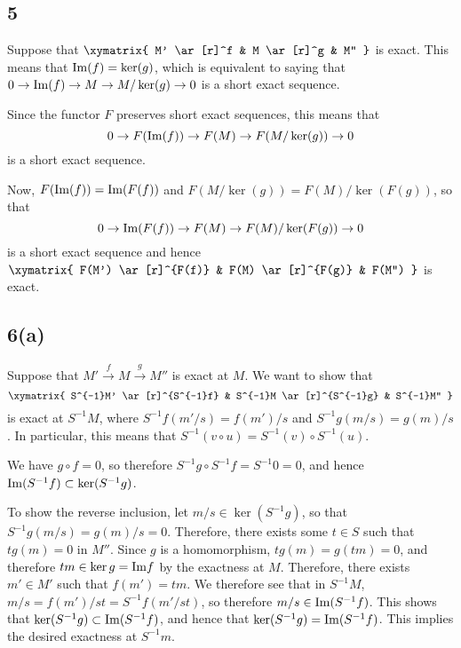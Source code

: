 \documentclass[12pt, reqno]{amsart}
\begin{document}




\newpage

\subsection*{5}

Suppose that 
$ 
\xymatrix{
M' \ar[r]^f & M \ar[r]^g & M'' 
}
$
is exact. This means that $\mathrm{Im}(f) = \ker(g)$, which 
is equivalent to saying that 
$0 \to \mathrm{Im}(f) \to M \to M/\ker(g) \to 0$
is a short exact sequence.

Since the functor $F$ preserves short exact sequences, this means that
$$0 \to F(\mathrm{Im}(f)) \to F(M) \to F(M / \ker(g)) \to 0$$ is a short exact sequence.

Now, $F(\mathrm{Im}(f)) = \mathrm{Im}(F(f))$ and $F ( M / \ker(g)) = F(M) / \ker(F(g))$, so that
$$0 \to \mathrm{Im}(F(f)) \to F(M) \to F(M) / \ker(F(g)) \to 0$$ is a short exact
sequence and hence 
$
\xymatrix{
F(M') \ar[r]^{F(f)} & F(M) \ar[r]^{F(g)} & F(M'') 
}
$
is exact.



\subsection*{6(a)}

Suppose that $M' \xrightarrow f M \xrightarrow g  M''$ is exact at $M$.
We want to show that 
\[ 
\xymatrix{
S^{-1}M' \ar[r]^{S^{-1}f} & S^{-1}M \ar[r]^{S^{-1}g} & S^{-1}M'' 
}
\] 
is exact at $S^{-1}M$, where
$S^{-1}f(m'/s) = f(m')/s$ and $S^{-1}g(m/s) = g(m)/s$. In particular, this
means that $S^{-1} (v \circ u) = S^{-1}(v) \circ S^{-1}(u)$.

We have $g \circ f = 0$, so therefore 
$S^{-1}g \circ S^{-1}f = S^{-1}0 = 0$, and hence 
$\mathrm{Im}(S^{-1}f) \subset \ker(S^{-1}g)$.

To show the reverse inclusion, let $m/s \in \ker(S^{-1}g)$, so that
$S^{-1}g(m/s) = g(m)/s = 0$. Therefore, there exists some $t \in S$ such that
$t g(m) = 0$ in $M''$. Since $g$ is a homomorphism, $tg(m) = g(tm) = 0$, and
therefore $tm \in \ker g = \mathrm{Im} f$ by the exactness at $M$. Therefore, there
exists $m' \in M'$ such that $f(m') = tm$.
We therefore see that in $S^{-1}M$, 
$m/s = f(m')/st = S^{-1}f(m'/st)$, so therefore $m/s \in \mathrm{Im}(S^{-1}f)$. This
shows that $\ker(S^{-1}g) \subset \mathrm{Im}(S^{-1}f)$, and hence that
$\ker (S^{-1}g) = \mathrm{Im} (S^{-1}f)$. This implies the desired exactness at 
$S^{-1}m$.
\end{document}
